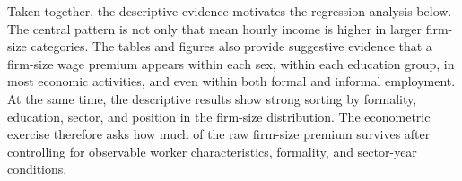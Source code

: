 Taken together, the descriptive evidence motivates the regression analysis
below. The central pattern is not only that mean hourly income is higher in
larger firm-size categories. The tables and figures also provide suggestive
evidence that a firm-size wage premium appears within each sex, within each
education group, in most economic activities, and even within both formal and
informal employment. At the same time, the descriptive results show strong
sorting by formality, education, sector, and position in the firm-size
distribution. The econometric exercise therefore asks how much of the raw
firm-size premium survives after controlling for observable worker
characteristics, formality, and sector-year conditions.
